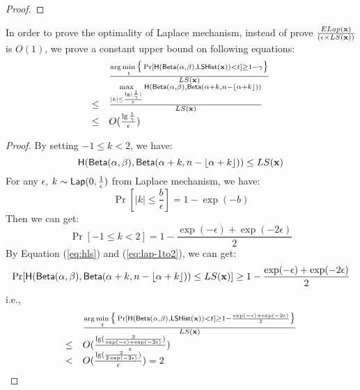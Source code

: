 \documentclass{article}
\begin{document}
{\begin{proof}
\end{proof}
\begin{thm}
In order to prove the optimality of Laplace mechanism, instead of prove
$\frac{ELap(\textbf{x})}{(\epsilon \times LS(\textbf{x}))}$ is $O(1)$, we prove a constant upper bound on following equations:
\[
\begin{array}{ll}
	 &	\frac{\arg\min\limits_{t}\big\{\Pr[\mathsf{H}(\mathsf{Beta}(\alpha, \beta), \mathsf{LSHist}(\textbf{x}))< t] \geq 1 - \gamma \big\}}
	 	{	LS(\textbf{x})	}\\
\leq &	\frac{\max\limits_{|k| \leq \frac{\lg(\frac{1}{\gamma})}{\epsilon}}
		\mathsf{H}(\mathsf{Beta}(\alpha, \beta), \mathsf{Beta}(\alpha + k, n - \lfloor \alpha + k \rfloor))}
		{	LS(\textbf{x})	}\\
\leq & 	O(\frac{\lg{\frac{1}{\gamma}}}{\epsilon})
\end{array}
\]
\end{thm}

\begin{proof}
By setting $ -1 \leq k < 2$, we have: 
\begin{equation}
\label{eq:hls}
\mathsf{H}(\mathsf{Beta}(\alpha, \beta), \mathsf{Beta}(\alpha + k, n - \lfloor \alpha + k \rfloor)) \leq LS(\textbf{x})
\end{equation}
For any $\epsilon$, $k \sim \mathsf{Lap}(0, \frac{1}{\epsilon})$ from Laplace mechanism, we have:
\[
\Pr[|k| \leq \frac{b}{\epsilon}] = 1 - \exp(-b)
\]
Then we can get:
\begin{equation}
\label{eq:lap-1to2}
\Pr[ -1 \leq k < 2] = 1 - \frac{\exp(-\epsilon) + \exp(-2\epsilon)}{2}
\end{equation}
By Equation (\ref{eq:hls}) and (\ref{eq:lap-1to2}), we can get:
\[
\Pr[\mathsf{H}(\mathsf{Beta}(\alpha, \beta), \mathsf{Beta}(\alpha + k, n - \lfloor \alpha + k \rfloor)) \leq LS(\textbf{x})] \geq 1 - \frac{\exp(-\epsilon) + \exp(-2\epsilon)}{2}
\]
i.e.,
\[
\begin{array}{ll}
	 &	\frac{\arg\min\limits_{t}\big\{\Pr[\mathsf{H}(\mathsf{Beta}(\alpha, \beta), \mathsf{LSHist}(\textbf{x}))< t] \geq 1 - \frac{\exp(-\epsilon) + \exp(-2\epsilon)}{2} \big\} }
	 {	LS(\textbf{x})	}\\
\leq & 	O(\frac{\lg( \frac{2}{\exp(-\epsilon) + \exp(-2\epsilon)})}{\epsilon})\\
<    & O(\frac{\lg( \frac{2}{2 \exp(-2\epsilon)})}{\epsilon}) = 2
\end{array}
\]
\end{proof}

}
\end{document}
